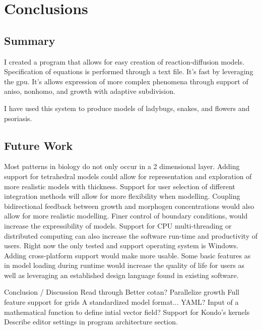 \chapter{Conclusions}
\section{Summary}
I created a program that allows for easy creation of reaction-diffusion models. Specification of equations is performed through a text file. It's fast by leveraging the gpu. It's allows expression of more complex phenomena through support of aniso, nonhomo, and growth with adaptive subdivision.

I have used this system to produce models of ladybugs, snakes, and flowers and psoriasis.




\section{Future Work}
Most patterns in biology do not only occur in a 2 dimensional layer. Adding support for tetrahedral models could allow for representation and exploration of more realistic models with thickness. Support for user selection of different integration methods will allow for more flexibility when modelling. Coupling bidirectional feedback between growth and morphogen concentrations would also allow for more realistic modelling. Finer control of boundary conditions, would increase the expressibility of models. Support for CPU multi-threading or distributed computing can also increase the software run-time and productivity of users. Right now the only tested and support operating system is Windows. Adding cross-platform support would make \ProgramName{} more usable. Some basic features as in model loading during runtime would increase the quality of life for users as well as leveraging an established design language found in existing software.

Conclusion / Discussion
	Read through
	Better cotan?
	Parallelize growth
	Full feature support for grids
	A standardized model format... YAML?
	Input of a mathematical function to define intial vector field?
	Support for Kondo's kernels
	Describe editor settings in program architecture section.